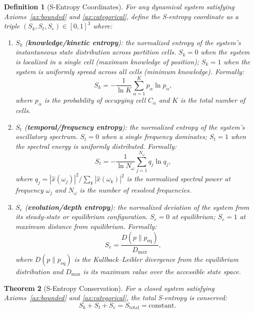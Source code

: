 \documentclass[11pt,twocolumn,a4paper]{article}
\newtheorem{theorem}{Theorem}[section]
\newtheorem{definition}[theorem]{Definition}
\newcommand{\Sk}{S_k}
\newcommand{\St}{S_t}
\newcommand{\Se}{S_e}
\begin{document}
\begin{definition}[S-Entropy Coordinates]
\label{def:sentropy}
For any dynamical system satisfying Axioms~\ref{ax:bounded} and
\ref{ax:categorical}, define the \emph{S-entropy coordinate} as a
triple $(\Sk, \St, \Se) \in [0,1]^3$ where:
\begin{enumerate}[label=(\roman*),leftmargin=*]
\item $\Sk$ (\textbf{knowledge/kinetic entropy}): the normalized
  entropy of the system's instantaneous state distribution across
  partition cells. $\Sk = 0$ when the system is localized in a
  single cell (maximum knowledge of position); $\Sk = 1$ when the
  system is uniformly spread across all cells (minimum knowledge).
  Formally:
  \begin{equation}
  \Sk = -\frac{1}{\ln K} \sum_{\alpha=1}^{K}
    p_\alpha \ln p_\alpha,
  \label{eq:Sk}
  \end{equation}
  where $p_\alpha$ is the probability of occupying cell $C_\alpha$
  and $K$ is the total number of cells.

\item $\St$ (\textbf{temporal/frequency entropy}): the normalized
  entropy of the system's oscillatory spectrum. $\St = 0$ when a
  single frequency dominates; $\St = 1$ when the spectral energy is
  uniformly distributed. Formally:
  \begin{equation}
  \St = -\frac{1}{\ln N_\omega}
    \sum_{j=1}^{N_\omega} q_j \ln q_j,
  \label{eq:St}
  \end{equation}
  where $q_j = |\hat{x}(\omega_j)|^2 / \sum_k |\hat{x}(\omega_k)|^2$
  is the normalized spectral power at frequency $\omega_j$ and
  $N_\omega$ is the number of resolved frequencies.

\item $\Se$ (\textbf{evolution/depth entropy}): the normalized
  deviation of the system from its steady-state or equilibrium
  configuration. $\Se = 0$ at equilibrium; $\Se = 1$ at maximum
  distance from equilibrium. Formally:
  \begin{equation}
  \Se = \frac{D(p \| p_{\mathrm{eq}})}{D_{\max}},
  \label{eq:Se}
  \end{equation}
  where $D(p \| p_{\mathrm{eq}})$ is the Kullback--Leibler divergence
  from the equilibrium distribution and $D_{\max}$ is its maximum
  value over the accessible state space.
\end{enumerate}
\end{definition}

\begin{theorem}[S-Entropy Conservation]
\label{thm:conservation}
For a closed system satisfying Axioms~\ref{ax:bounded} and
\ref{ax:categorical}, the total S-entropy is conserved:
\begin{equation}
\Sk + \St + \Se = S_{\mathrm{total}} = \text{constant}.
\label{eq:conservation}
\end{equation}
\end{theorem}
\end{document}
